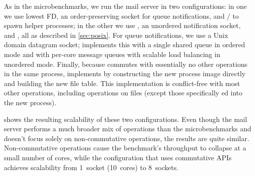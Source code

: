As in the microbenchmarks, we run the mail server in two configurations:
in one we use lowest FD, an order-preserving socket for queue
notifications, and / to spawn helper processes; in
the other we use , an unordered notification socket, and
, all as described in \cref{sec:posix}.
For queue notifications, we use a Unix domain datagram socket;
\sys implements this with a single shared queue in ordered mode and with
per-core message queues with scalable load balancing in unordered
mode.  Finally, because  commutes with essentially no other
operations in the same process,
\sys implements  by constructing the new process image
directly and building the new file
table. This implementation is conflict-free with most other operations,
including operations on
 files (except those specifically ed into the
new process).

\begin{figure}
  \centering
  
  \label{fig:mailbench}
\end{figure}

 shows the resulting scalability of these two
configurations.  Even though the mail server performs a much broader mix
of operations than the microbenchmarks and doesn't focus solely on
non-commutative operations, the results are quite similar.
Non-commutative operations cause the benchmark's throughput to collapse
at a small number of cores, while the configuration that uses
commutative APIs achieves 
scalability from 1~socket
(10~cores) to 8~sockets.
%
%




